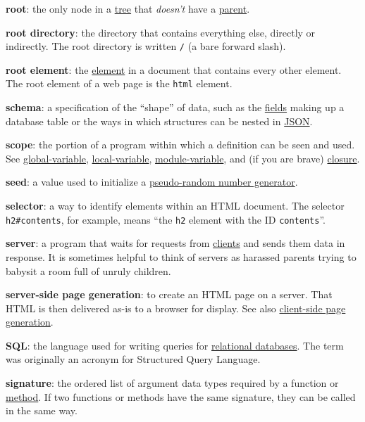 \textbf{root}: the only node in a \protect\hyperlink{g:tree}{tree} that
\emph{doesn't} have a \protect\hyperlink{g:parent-node}{parent}.

\textbf{root directory}: the directory that contains everything else,
directly or indirectly. The root directory is written \texttt{/} (a bare
forward slash).

\textbf{root element}: the \protect\hyperlink{g:element}{element} in a
document that contains every other element. The root element of a web
page is the \texttt{html} element.

\textbf{schema}: a specification of the ``shape'' of data, such as the
\protect\hyperlink{g:field}{fields} making up a database table or the
ways in which structures can be nested in
\protect\hyperlink{g:json}{JSON}.

\textbf{scope}: the portion of a program within which a definition can
be seen and used. See
\protect\hyperlink{g:global-variable}{global-variable},
\protect\hyperlink{g:local-variable}{local-variable},
\protect\hyperlink{g:module-variable}{module-variable}, and (if you are
brave) \protect\hyperlink{g:closure}{closure}.

\textbf{seed}: a value used to initialize a
\protect\hyperlink{g:prng}{pseudo-random number generator}.

\textbf{selector}: a way to identify elements within an HTML document.
The selector \texttt{h2\#contents}, for example, means ``the \texttt{h2}
element with the ID \texttt{contents}''.

\textbf{server}: a program that waits for requests from
\protect\hyperlink{g:client}{clients} and sends them data in response.
It is sometimes helpful to think of servers as harassed parents trying
to babysit a room full of unruly children.

\textbf{server-side page generation}: to create an HTML page on a
server. That HTML is then delivered as-is to a browser for display. See
also \protect\hyperlink{g:client-side-page-generation}{client-side page
generation}.

\textbf{SQL}: the language used for writing queries for
\protect\hyperlink{g:relational-database}{relational databases}. The
term was originally an acronym for Structured Query Language.

\textbf{signature}: the ordered list of argument data types required by
a function or \protect\hyperlink{g:method}{method}. If two functions or
methods have the same signature, they can be called in the same way.


